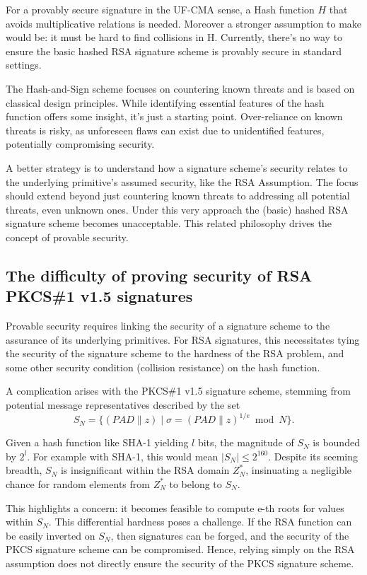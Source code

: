 \documentclass[]{final_report}
\theoremstyle{definition}
\begin{document}
For a provably secure signature in the UF-CMA sense, a Hash function \(H\) that avoids multiplicative relations is needed. Moreover a stronger assumption to make would be: it must be hard to find collisions in H. Currently, there's no way to ensure the basic hashed RSA signature scheme is provably secure in standard settings.

The Hash-and-Sign scheme focuses on countering known threats and is based on classical design principles. While identifying essential features of the hash function offers some insight, it's just a starting point. Over-reliance on known threats is risky, as unforeseen flaws can exist due to unidentified features, potentially compromising security.

A better strategy is to understand how a signature scheme's security relates to the underlying primitive's assumed security, like the RSA Assumption. The focus should extend beyond just countering known threats to addressing all potential threats, even unknown ones. Under this very approach the (basic) hashed RSA signature scheme becomes unacceptable. This related philosophy drives the concept of provable security.


\subsection{The difficulty of proving security of RSA PKCS\#1 v1.5 signatures}

Provable security requires linking the security of a signature scheme to the assurance of its underlying primitives. For RSA signatures, this necessitates tying the security of the signature scheme to the hardness of the RSA problem, and some other security condition (collision resistance) on the hash function.

A complication arises with the PKCS\#1 v1.5 signature scheme, stemming from potential message representatives described by the set
\[ S_N = \{ (PAD \| z) \mid \sigma = (PAD \| z)^{1/e} \bmod N \}. \]

Given a hash function like SHA-1 yielding $l$ bits, the magnitude of $S_N$ is bounded by $2^l$. For example with SHA-1, this would mean  $|S_N| \leq 2^{160}$. Despite its seeming breadth, $S_N$ is insignificant within the RSA domain \( Z_N^* \), insinuating a negligible chance for random elements from \( Z_N^* \) to belong to \( S_N \).

This highlights a concern: it becomes feasible to compute e-th roots for values within $S_N$. This differential hardness poses a challenge. If the RSA function can be easily inverted on  $S_N$, then signatures can be forged, and the security of the PKCS signature scheme can be compromised. Hence, relying simply on the RSA assumption does not directly ensure the security of the PKCS signature scheme. 
\end{document}
